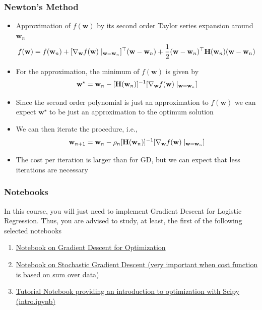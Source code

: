 \documentclass{beamer}
\newcommand{\w}{{\mathbf w}}
\begin{document}
\begin{frame}

	\frametitle{Newton's Method}

		\begin{itemize}
		\item Approximation of $f(\w)$ by its second order Taylor series expansion around $\w_n$
		$$f(\w) = f(\w_n) + [\nabla_\w f(\w)\mid_{\w=\w_n}]^\top (\w - \w_n) + \frac{1}{2} (\w - \w_n)^\top {\bf H}(\w_n)(\w - \w_n)$$
		\item For the approximation, the minimum of $f(\w)$ is given by
		$$\w^\star = \w_n - [{\bf H}(\w_n)]^{-1} [\nabla_\w f(\w)\mid_{\w=\w_n}]$$
		\item Since the second order polynomial is just an approximation to $f(\w)$ we can expect $\w^\star$ to be just an approximation to the optimum solution
		\item We can then iterate the procedure, i.e.,
		$$\w_{n+1} = \w_n - \rho_n [{\bf H}(\w_n)]^{-1} [\nabla_\w f(\w)\mid_{\w=\w_n}]$$
		\item The cost per iteration is larger than for GD, but we can expect that less iterations are necessary

		\end{itemize}


\end{frame}


\begin{frame}

	\frametitle{Notebooks}

In this course, you will just need to implement Gradient Descent for Logistic Regression. Thus, you are advised to study, at least, the first of the following selected notebooks 

\begin{enumerate}

\item \href{https://github.com/hammadshaikhha/Math-of-Machine-Learning-Course-by-Siraj/tree/master/Gradient\%20Descent\%20for\%20Optimization}{Notebook on Gradient Descent for Optimization}
\item \href{https://github.com/dtnewman/gradient_descent}{Notebook on Stochastic Gradient Descent (very important when cost function is based on sum over data)}
\item\href{https://github.com/mmckerns/tutmom}{Tutorial Notebook providing an introduction to optimization with Scipy (intro.ipynb)}

\end{enumerate}

\end{frame}
\end{document}
